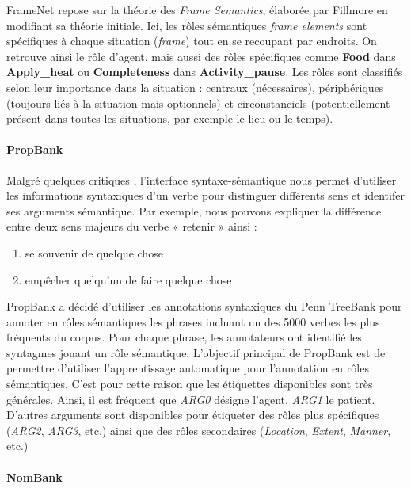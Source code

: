 FrameNet \citep{baker1998berkeley} repose sur la théorie des \textit{Frame
Semantics}, élaborée par Fillmore en modifiant sa théorie initiale. Ici, les
rôles sémantiques \textit{frame elements} sont spécifiques à chaque situation
(\textit{frame}) tout en se recoupant par endroits. On retrouve ainsi le rôle
d'agent, mais aussi des rôles spécifiques comme \textbf{Food} dans
\textbf{Apply\_heat} ou \textbf{Completeness} dans \textbf{Activity\_pause}.
Les rôles sont classifiés selon leur importance dans la situation : centraux
(nécessaires), périphériques (toujours liés à la situation mais optionnels) et
circonstanciels (potentiellement présent dans toutes les situations, par
exemple le lieu ou le temps).

\paragraph{PropBank}

Malgré quelques critiques \citep{riemer2011conception}, l'interface
syntaxe-sémantique nous permet d'utiliser les informations syntaxiques d'un
verbe pour distinguer différents sens et identifer ses arguments sémantique.
Par exemple, nous pouvons expliquer la différence entre deux sens majeurs du
verbe « retenir » ainsi :

\begin{enumerate}
    \item se souvenir de quelque chose
    \item empêcher quelqu'un de faire quelque chose
\end{enumerate}

PropBank \citep{palmer2005proposition} a décidé d'utiliser les annotations
syntaxiques du Penn TreeBank \citep{marcus1993building} pour annoter en rôles
sémantiques les phrases incluant un des 5000 verbes les plus fréquents du
corpus. Pour chaque phrase, les annotateurs ont identifié les syntagmes jouant
un rôle sémantique. L'objectif principal de PropBank est de permettre
d'utiliser l'apprentissage automatique pour l'annotation en rôles sémantiques.
C'est pour cette raison que les étiquettes disponibles sont très générales.
Ainsi, il est fréquent que \textit{ARG0} désigne l'agent, \textit{ARG1} le
patient. D'autres arguments sont disponibles pour étiqueter des rôles plus
spécifiques (\textit{ARG2}, \textit{ARG3}, etc.) ainsi que des rôles
secondaires (\textit{Location}, \textit{Extent}, \textit{Manner}, etc.)

\paragraph{NomBank}

